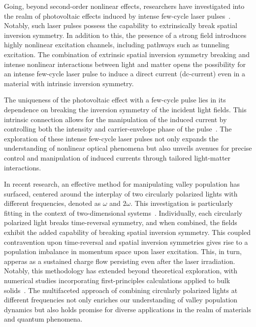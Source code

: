 Going, beyond second-order nonlinear effects, researchers have investigated into the realm of
photovoltaic effects induced by intense few-cycle laser
pulses~\cite{Schiffrin2013,PhysRevLett.113.087401,PhysRevLett.116.057401,Higuchi2017,Heide_2020,Morimoto_2022}.
Notably, such laser pulses possess the capability to extrinsically break spatial inversion
symmetry. In addition to this, the presence of a strong field introduces highly nonlinear
excitation channels, including pathways such as tunneling excitation. The combination of extrinsic spatial inversion symmetry breaking and intense nonlinear interactions between light and matter opens the possibility for an intense few-cycle laser pulse to induce a direct current (dc-current) even in a material with intrinsic inversion symmetry.


The uniqueness of the photovoltaic effect with a few-cycle pulse lies in its dependence on breaking the inversion symmetry of the incident light fields. This intrinsic connection allows for the manipulation of the induced current by controlling both the intensity and carrier-envelope phase of the pulse~\cite{Schiffrin2013,Higuchi2017}. The exploration of these intense few-cycle laser pulses not only expands the understanding of nonlinear optical phenomena but also unveils avenues for precise control and manipulation of induced currents through tailored light-matter interactions.


In recent research, an effective method for manipulating valley population has surfaced, centered
around the interplay of two circularly polarized lights with different frequencies, denoted as
$\omega$ and $2\omega$. This investigation is particularly fitting in the context of
two-dimensional systems~\cite{Jimenez-Galan2020,Mrudul:21}. Individually, each circularly polarized
light breaks time-reversal symmetry, and when combined, the fields exhibit the added capability of
breaking spatial inversion symmetry. This coupled contravention upon time-reversal and spatial
inversion symmetries gives rise to a population imbalance in momentum space upon laser excitation.
This, in turn, apperas as a sustained charge flow persisting even after the laser irradiation. Notably, this methodology has extended beyond theoretical exploration, with numerical studies incorporating first-principles calculations applied to bulk solids~\cite{PhysRevLett.127.126601}. The multifaceted approach of combining circularly polarized lights at different frequencies not only enriches our understanding of valley population dynamics but also holds promise for diverse applications in the realm of materials and quantum phenomena.
